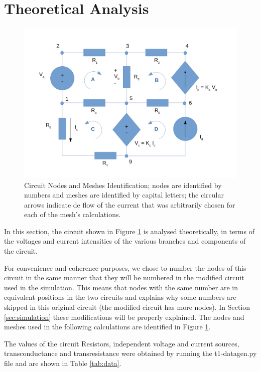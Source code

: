 \section{Theoretical Analysis}
\label{sec:analysis}

\begin{figure}[h] 
\centering
\includegraphics[width=0.8\linewidth]{circuit_analysis.pdf}
\caption{Circuit Nodes and Meshes Identification; nodes are identified by numbers and meshes are identified by capital letters; the circular arrows indicate de flow of the current that was arbitrarily chosen for each of the mesh's calculations.}
\label{fig:circuit_analysis}
\end{figure}    

\newpage

In this section, the circuit shown in Figure \ref{fig:circuit_analysis} is analysed
theoretically, in terms of the voltages and current intensities of the various branches and components of the circuit.

For convenience and coherence purposes, we chose to number the nodes of this circuit in the same manner that they will be numbered in the modified circuit used in the simulation. This means that nodes with the same number are in equivalent positions in the two circuits and explains why some numbers are skipped in this original circuit (the modified circuit has more nodes). In Section \ref{sec:simulation} these modifications will be properly explained.
The nodes and meshes used in the following calculations are identified in Figure \ref{fig:circuit_analysis}.

The values of the circuit Resistors, independent voltage and current sources, transconductance and transresistance were obtained by running the t1-datagen.py file and are shown in Table \ref{tab:data}.

